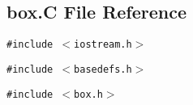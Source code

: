 \subsection{box.C File Reference}
\label{box.C}
{\tt \#include $<$iostream.h$>$}\par
{\tt \#include $<$basedefs.h$>$}\par
{\tt \#include $<$box.h$>$}\par
